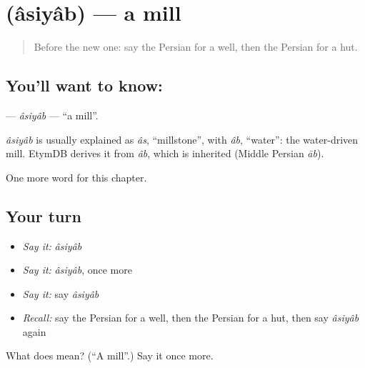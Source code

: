 \section[\texorpdfstring{\fa{آسیاب} (âsiyâb)}{آسیاب (âsiyâb)}]{ (âsiyâb) — a mill}

\label{lesson:FA-C156-asiyab}



\begin{quote}
Before the new one: say the Persian for a well, then the Persian for a hut.
\end{quote}

\subsection*{You'll want to know: }
\textbf{} — \emph{âsiyâb} — \textquotedblleft{}a mill\textquotedblright{}.

\begin{cousinweb}
\emph{âsiyâb} is usually explained as \emph{âs}, \textquotedblleft{}millstone\textquotedblright{}, with \emph{âb}, \textquotedblleft{}water\textquotedblright{}: the water-driven mill. EtymDB derives it from \emph{âb}, which is inherited (Middle Persian \emph{āb}).
\end{cousinweb}

\begin{grammarlens}[title={What you've built}]
One more word for this chapter.
\end{grammarlens}

\subsection*{Your turn}
\begin{itemize}
\raggedright
  \item \emph{Say it:} \emph{âsiyâb}
  \item \emph{Say it:} \emph{âsiyâb}, once more
  \item \emph{Say it:} say \emph{âsiyâb}
  \item \emph{Recall:} say the Persian for a well, then the Persian for a hut, then say \emph{âsiyâb} again
\end{itemize}

\begin{tcolorbox}[breakable,colback=teal!4,colframe=teal!35!black,title={Before you move on}]
What does  mean? (\textquotedblleft{}A mill\textquotedblright{}.) Say it once more.
\end{tcolorbox}
